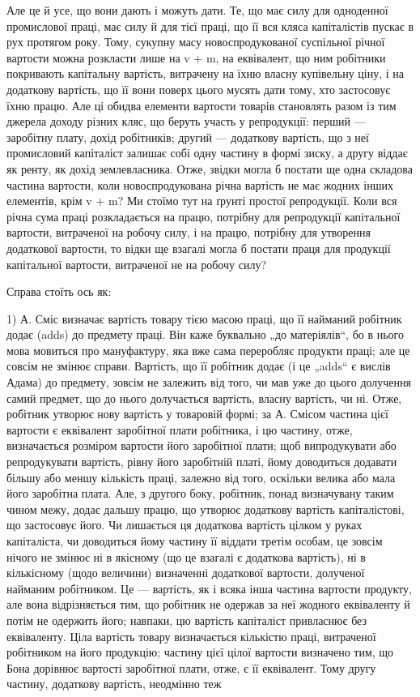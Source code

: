 Але це й усе, що вони дають і можуть дати. Те, що має силу для одноденної промислової праці, має
силу й для тієї праці, що її вся кляса капіталістів пускає в рух протягом року. Тому, сукупну масу
новоспродукованої суспільної річної вартости можна розкласти лише на v + m, на еквівалент, що ним
робітники покривають капітальну вартість, витрачену на їхню власну купівельну ціну, і на додаткову
вартість, що її вони поверх цього мусять дати тому, хто застосовує їхню працю. Але ці обидва
елементи вартости товарів становлять разом із тим джерела доходу різних кляс, що беруть участь у
репродукції: перший — заробітну плату, дохід робітників; другий — додаткову вартість, що з неї
промисловий капіталіст залишає собі одну частину в формі зиску, а другу віддає як ренту, як дохід
землевласника. Отже, звідки могла б постати ще одна складова частина вартости, коли новоспродукована
річна вартість не має жодних інших елементів, крім v + m? Ми стоїмо тут на ґрунті простої
репродукції. Коли вся річна сума праці розкладається на працю, потрібну для репродукції капітальної
вартости, витраченої на робочу силу, і на працю, потрібну для утворення додаткової вартости, то
відки ще взагалі могла б постати праця для продукції капітальної вартости, витраченої не на робочу
силу?

Справа стоїть ось як:

1) А. Сміс визначає вартість товару тією масою праці, що її найманий робітник додає (adds) до
предмету праці. Він каже буквально „до матеріялів“, бо в нього мова мовиться про мануфактуру, яка
вже сама переробляє продукти праці; але це совсім не змінює справи. Вартість, що її робітник додає
(і це „adds“ є вислів Адама) до предмету, зовсім
не залежить від того, чи мав уже до цього долучення самий предмет, що до нього долучається вартість,
власну вартість, чи ні. Отже, робітник утворює нову вартість у товаровій формі; за А. Смісом частина
цієї вартости є еквівалент заробітної плати робітника, і цю частину, отже, визначається розміром
вартости його заробітної плати; щоб випродукувати або репродукувати вартість, рівну його заробітній
платі, йому
доводиться додавати більшу або меншу кількість праці, залежно від того, оскільки велика або мала
його заробітна плата. Але, з другого боку, робітник, понад визначувану таким чином межу, додає
дальшу працю, що утворює додаткову вартість капіталістові, що застосовує його. Чи лишається ця
додаткова вартість цілком у руках капіталіста, чи доводиться йому частину її віддати третім особам,
це зовсім нічого не змінює ні в якісному (що це взагалі є додаткова вартість), ні в кількісному
(щодо величини) визначенні додаткової вартости, долученої найманим робітником. Це — вартість, як і
всяка інша частина вартости продукту, але вона відрізняється тим, що робітник не одержав за неї
жодного еквіваленту й потім не одержить його; навпаки, цю вартість капіталіст привласнює без
еквіваленту. Ціла вартість товару визначається кількістю
праці, витраченої робітником на його продукцію; частину цієї цілої вартости визначено тим, що Бона
дорівнює вартості заробітної плати, отже, є її еквівалент. Тому другу частину, додаткову вартість,
неодмінно теж
